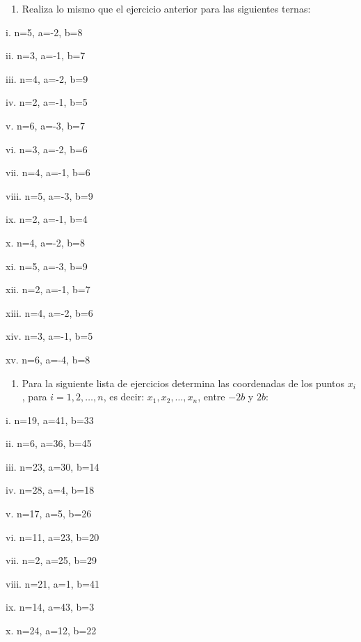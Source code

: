 \documentclass[]{book}
\providecommand{\tightlist}{%
  \setlength{\itemsep}{0pt}\setlength{\parskip}{0pt}}
\begin{document}
\begin{enumerate}
\def\labelenumi{\arabic{enumi}.}
\setcounter{enumi}{1}
\tightlist
\item
  Realiza lo mismo que el ejercicio anterior para las siguientes ternas:
\end{enumerate}

\begin{multicols}{2}
   
    i. n=5, a=-2, b=8
   
    ii. n=3, a=-1, b=7
   
    iii. n=4, a=-2, b=9
   
    iv. n=2, a=-1, b=5
   
    v. n=6, a=-3, b=7
   
    vi. n=3, a=-2, b=6
   
    vii. n=4, a=-1, b=6
   
    viii. n=5, a=-3, b=9
   
    ix. n=2, a=-1, b=4
   
    x. n=4, a=-2, b=8
   
   
    xi. n=5, a=-3, b=9
   
    xii. n=2, a=-1, b=7
   
    xiii. n=4, a=-2, b=6
   
    xiv. n=3, a=-1, b=5
   
    xv. n=6, a=-4, b=8
\end{multicols}

\begin{enumerate}
\def\labelenumi{\arabic{enumi}.}
\setcounter{enumi}{2}
\tightlist
\item
  Para la siguiente lista de ejercicios determina las coordenadas de los
  puntos \(x_i\), para \(i=1,2,\ldots,n\), es decir:
  \(x_1,x_2,\ldots,x_n\), entre \(-2b\) y \(2b\):
\end{enumerate}

\begin{multicols}{2}
   
    i. n=19, a=41, b=33
   
    ii. n=6, a=36, b=45
   
    iii. n=23, a=30, b=14
   
    iv. n=28, a=4, b=18
   
    v. n=17, a=5, b=26
   
    vi. n=11, a=23, b=20
   
    vii. n=2, a=25, b=29
   
    viii. n=21, a=1, b=41
   
    ix. n=14, a=43, b=3
   
    x. n=24, a=12, b=22
\end{multicols}
\end{document}
